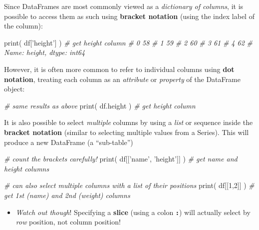 \documentclass[]{book}
\newenvironment{Shaded}{\begin{snugshade}}{\end{snugshade}}
\newcommand{\DecValTok}[1]{\textcolor[rgb]{0.00,0.00,0.81}{#1}}
\newcommand{\StringTok}[1]{\textcolor[rgb]{0.31,0.60,0.02}{#1}}
\newcommand{\CommentTok}[1]{\textcolor[rgb]{0.56,0.35,0.01}{\textit{#1}}}
\newcommand{\BuiltInTok}[1]{#1}
\newcommand{\NormalTok}[1]{#1}
\providecommand{\tightlist}{%
  \setlength{\itemsep}{0pt}\setlength{\parskip}{0pt}}
\begin{document}
Since DataFrames are most commonly viewed as a \emph{dictionary of
columns}, it is possible to access them as such using \textbf{bracket
notation} (using the index label of the column):

\begin{Shaded}
\begin{Highlighting}[]
\BuiltInTok{print}\NormalTok{( df[}\StringTok{'height'}\NormalTok{] )  }\CommentTok{# get height column}
    \CommentTok{# 0    58}
    \CommentTok{# 1    59}
    \CommentTok{# 2    60}
    \CommentTok{# 3    61}
    \CommentTok{# 4    62}
    \CommentTok{# Name: height, dtype: int64}
\end{Highlighting}
\end{Shaded}

However, it is often more common to refer to individual columns using
\textbf{dot notation}, treating each column as an \emph{attribute} or
\emph{property} of the DataFrame object:

\begin{Shaded}
\begin{Highlighting}[]
\CommentTok{# same results as above}
\BuiltInTok{print}\NormalTok{( df.height )  }\CommentTok{# get height column}
\end{Highlighting}
\end{Shaded}

It is also possible to select \emph{multiple} columns by using a
\emph{list} or sequence inside the \textbf{bracket notation} (similar to
selecting multiple values from a Series). This will produce a new
DataFrame (a ``sub-table'')

\begin{Shaded}
\begin{Highlighting}[]
\CommentTok{# count the brackets carefully!}
\BuiltInTok{print}\NormalTok{( df[[}\StringTok{'name'}\NormalTok{, }\StringTok{'height'}\NormalTok{]] )  }\CommentTok{# get name and height columns}

\CommentTok{# can also select multiple columns with a list of their positions}
\BuiltInTok{print}\NormalTok{( df[[}\DecValTok{1}\NormalTok{,}\DecValTok{2}\NormalTok{]] )  }\CommentTok{# get 1st (name) and 2nd (weight) columns}
\end{Highlighting}
\end{Shaded}

\begin{itemize}
\tightlist
\item
  \emph{Watch out though}! Specifying a \textbf{slice} (using a colon
  \textbf{\texttt{:}}) will actually select by \emph{row} position, not
  column position!
\end{itemize}
\end{document}
